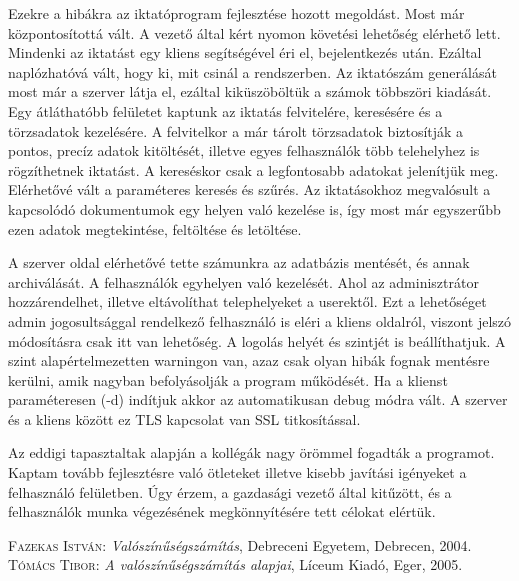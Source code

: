 \documentclass[
]{thesis-ekf}
\theoremstyle{definition}
\theoremstyle{remark}
\begin{document}
Ezekre a hibákra az iktatóprogram fejlesztése hozott megoldást. Most már központosítottá vált. A vezető által kért nyomon követési lehetőség elérhető lett. Mindenki az iktatást egy kliens segítségével éri el, bejelentkezés után. Ezáltal naplózhatóvá vált, hogy ki, mit csinál a rendszerben. Az iktatószám generálását most már a szerver látja el, ezáltal kiküszöböltük a számok többszöri kiadását. Egy átláthatóbb felületet kaptunk az iktatás felvitelére, keresésére és a törzsadatok kezelésére.  A felvitelkor a már tárolt törzsadatok biztosítják a pontos, precíz adatok kitöltését, illetve egyes felhasználók több telehelyhez is rögzíthetnek iktatást.  A kereséskor csak a legfontosabb adatokat jelenítjük meg. Elérhetővé vált a paraméteres keresés és szűrés.  Az iktatásokhoz megvalósult a kapcsolódó dokumentumok egy helyen való kezelése is, így most már egyszerűbb ezen adatok megtekintése, feltöltése és letöltése. 

A szerver oldal elérhetővé tette számunkra az adatbázis mentését, és annak archiválását. A felhasználók egyhelyen való kezelését. Ahol az adminisztrátor hozzárendelhet, illetve eltávolíthat telephelyeket a userektől. Ezt a lehetőséget admin jogosultsággal rendelkező felhasználó is eléri a kliens oldalról, viszont jelszó módosításra csak itt van lehetőség.  A logolás helyét és szintjét is beállíthatjuk. A szint alapértelmezetten warningon van, azaz csak olyan hibák fognak mentésre kerülni, amik nagyban befolyásolják a program működését. Ha a klienst paraméteresen (-d) indítjuk akkor az automatikusan debug módra vált. A szerver és a kliens között ez TLS kapcsolat van SSL titkosítással. 

Az eddigi tapasztaltak alapján a kollégák nagy örömmel fogadták a programot. Kaptam tovább fejlesztésre való ötleteket illetve kisebb javítási igényeket a felhasználó felületben.  Úgy érzem, a gazdasági vezető által kitűzött, és a felhasználók munka végezésének megkönnyítésére tett célokat elértük.
\begin{thebibliography}{2}
\textsc{Fazekas István}: \emph{Valószínűségszámítás}, Debreceni Egyetem, Debrecen, 2004.
\textsc{Tómács Tibor}: \emph{A valószínűségszámítás alapjai}, Líceum Kiadó, Eger, 2005.
\end{thebibliography}
\end{document}
